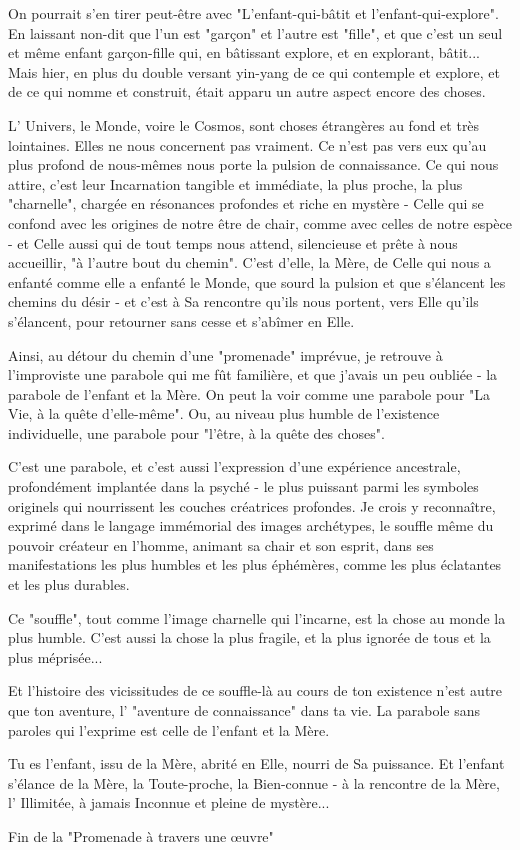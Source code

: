 On pourrait s'en tirer peut-être avec "L'enfant-qui-bâtit et l'enfant-qui-explore". En laissant non-dit que l'un est "garçon" et l'autre est "fille", et que c'est un seul et même enfant garçon-fille qui, en bâtissant explore, et en explorant, bâtit... Mais hier, en plus du double versant yin-yang de ce qui contemple et explore, et de ce qui nomme et construit, était apparu un autre aspect encore des choses.

L' Univers, le Monde, voire le Cosmos, sont choses étrangères au fond et très lointaines. Elles ne nous concernent pas vraiment. Ce n'est pas vers eux qu'au plus profond de nous-mêmes nous porte la pulsion de connaissance. Ce qui nous attire, c'est leur Incarnation tangible et immédiate, la plus proche, la plus "charnelle", chargée en résonances profondes et riche en mystère - Celle qui se confond avec les origines de notre être de chair, comme avec celles de notre espèce - et Celle aussi qui de tout temps nous attend, silencieuse et prête à nous accueillir, "à l'autre bout du chemin". C'est d'elle, la Mère, de Celle qui nous a enfanté comme elle a enfanté le Monde, que sourd la pulsion et que s'élancent les chemins du désir - et c'est à Sa rencontre qu'ils nous portent, vers Elle qu'ils s'élancent, pour retourner sans cesse et s'abîmer en Elle.

Ainsi, au détour du chemin d'une "promenade" imprévue, je retrouve à l'improviste une parabole qui me fût familière, et que j'avais un peu oubliée - la parabole de l'enfant et la Mère. On peut la voir comme une parabole pour "La Vie, à la quête d'elle-même". Ou, au niveau plus humble de l'existence individuelle, une parabole pour "l'être, à la quête des choses".

C'est une parabole, et c'est aussi l'expression d'une expérience ancestrale, profondément implantée dans la psyché - le plus puissant parmi les symboles originels qui nourrissent les couches créatrices profondes. Je crois y reconnaître, exprimé dans le langage immémorial des images archétypes, le souffle même du pouvoir créateur en l'homme, animant sa chair et son esprit, dans ses manifestations les plus humbles et les plus éphémères, comme les plus éclatantes et les plus durables.

Ce "souffle", tout comme l'image charnelle qui l'incarne, est la chose au monde la plus humble. C'est aussi la chose la plus fragile, et la plus ignorée de tous et la plus méprisée...

Et l'histoire des vicissitudes de ce souffle-là au cours de ton existence n'est autre que ton aventure, l' "aventure de connaissance" dans ta vie. La parabole sans paroles qui l'exprime est celle de l'enfant et la Mère.

Tu es l'enfant, issu de la Mère, abrité en Elle, nourri de Sa puissance. Et l'enfant s'élance de la Mère, la Toute-proche, la Bien-connue - à la rencontre de la Mère, l' Illimitée, à jamais Inconnue et pleine de mystère...

\hfill Fin de la "Promenade à travers une œuvre"

